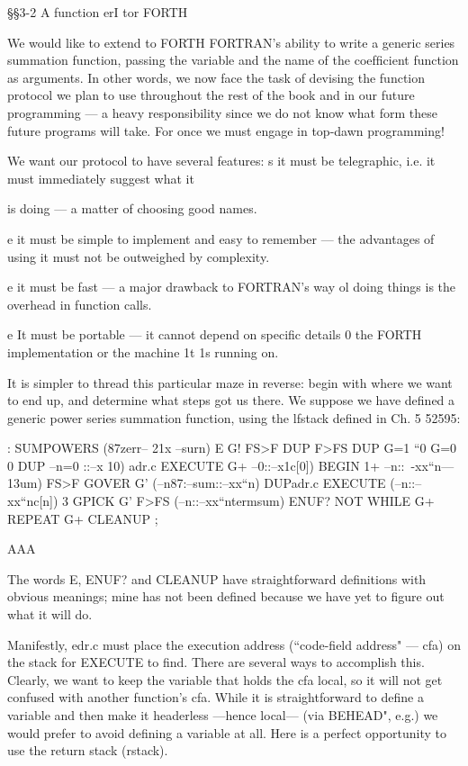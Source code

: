 {§§3-2 A function erI tor FORTH

We would like to extend to FORTH FORTRAN’s ability to write
a generic series summation function, passing the variable and the
name of the coefﬁcient function as arguments. In other words, we
now face the task of devising the function protocol we plan to use
throughout the rest of the book and in our future programming
— a heavy responsibility since we do not know what form these
future programs will take. For once we must engage in top-dawn
programming!

We want our protocol to have several features:
s it must be telegraphic, i.e. it must immediately suggest what it

is doing — a matter of choosing good names.

e it must be simple to implement and easy to remember — the
advantages of using it must not be outweighed by complexity.

e it must be fast — a major drawback to FORTRAN's way ol
doing things is the overhead in function calls.

e It must be portable — it cannot depend on specific details 0
the FORTH implementation or the machine 1t 1s running on.

It is simpler to thread this particular maze in reverse: begin with
where we want to end up, and determine what steps got us there.
We suppose we have deﬁned a generic power series summation
function, using the lfstack deﬁned in Ch. 5 52595:

: SUMPOWERS (87zerr-- 21x --surn)
E G! \storeerror
FS>F DUP F>FS \gettypeofx
DUP G=1 \x“0
G=0 0 DUP --n=0 ::--x 10)
adr.c EXECUTE G+ --0::--x1c[0])
BEGIN 1+ --n::~-xx“n—13um)
FS>F GOVER G'
(--n87:--sum::--xx“n)
DUPadr.c EXECUTE
(--n::--xx“nc[n])
3 GPICK G' F>FS
(--n::--xx“ntermsum)
ENUF? NOT WHILE
G+
REPEAT G+ CLEANUP ;

AAA

The words E, ENUF? and CLEANUP have straightforward
deﬁnitions with obvious meanings; mine has not been deﬁned
because we have yet to ﬁgure out what it will do.

Manifestly, edr.c must place the execution address (“code-ﬁeld
address" — cfa) on the stack for EXECUTE to ﬁnd. There are
several ways to accomplish this. Clearly, we want to keep the
variable that holds the cfa local, so it will not get confused with
another function’s cfa. While it is straightforward to deﬁne a
variable and then make it headerless —hence local— (via
BEHEAD", e.g.) we would prefer to avoid defining a variable at
all. Here is a perfect opportunity to use the return stack (rstack).

}
